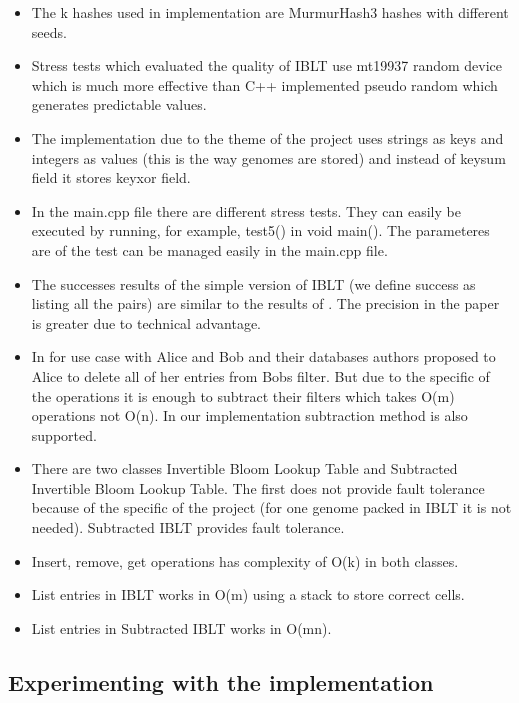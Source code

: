 \documentclass{article}
\begin{document}
\begin{itemize}
        (x + y) - y = x even if (x + y) overflowed. This way all the operations
        remain correct even if the filter is packed very tight.
    \item The k hashes used in implementation are MurmurHash3 \textcite{repo} hashes with 
different seeds.
    \item Stress tests which evaluated the quality of IBLT use mt19937 random device
        which is much more effective than C++ implemented pseudo random which generates
predictable values.
    \item The implementation due to the theme of the project uses strings as keys
        and integers as values (this is the way genomes are stored) and instead 
        of keysum field it stores keyxor field.
    \item In the main.cpp file there are different stress tests. They can easily 
        be executed by running, for example, test5() in void main(). The parameteres
        are of the test can be managed easily in the main.cpp file.
    \item The successes results of the simple version of IBLT (we define success as listing all the pairs) 
        are similar to the results of \textcite{GoMi2011}. The precision in the
        paper is greater due to technical advantage.
    \item In \textcite{GoMi2011} for use case with Alice and Bob and their databases
        authors proposed to Alice to delete all of her entries from Bobs filter.
        But due to the specific of the operations it is enough to subtract their 
        filters which takes O(m) operations not O(n). In our implementation 
        subtraction method is also supported.
    \item There are two classes Invertible Bloom Lookup Table and Subtracted 
        Invertible Bloom Lookup Table. The first does not provide fault tolerance 
        because of the specific of the project (for one genome packed in IBLT it
        is not needed). Subtracted IBLT provides fault tolerance.
    \item Insert, remove, get operations has complexity of O(k) in both classes. 
    \item List entries in IBLT works in O(m) using a stack to store correct cells.
    \item List entries in Subtracted IBLT works in O(mn).
\end{itemize}
\subsection{Experimenting with the implementation}
\end{document}
